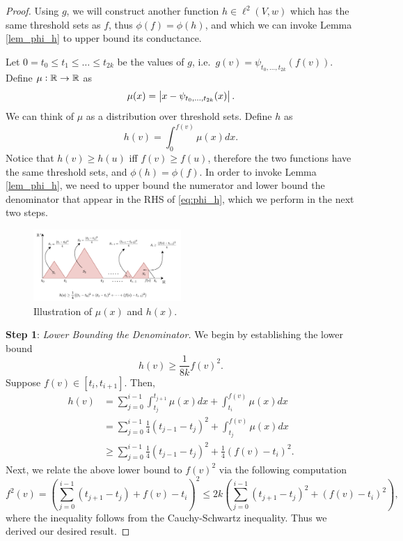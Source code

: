 \documentclass[11pt]{article}
\begin{document}
\begin{proof}
    Using $g$, we will construct another function $h \in \ell^2(V,w)$ which has the same threshold sets as $f$, thus $\phi(f) = \phi(h)$, and which we can invoke Lemma \ref{lem_phi_h} to upper bound its conductance.

    Let $0 = t_0 \leq t_1 \leq \hdots \leq t_{2k}$ be the values of $g$, i.e.\ $g(v) = \psi_{t_0,\hdots,t_{2k}}(f(v))$. Define $\mu : \mathbb R \to \mathbb R$ as
    $$\mu(x) = \left| x - \psi_{t_0,\hdots,t_{2k}}(x) \right|.$$
    We can think of $\mu$ as a distribution over threshold sets. Define $h$ as
    $$h(v) = \int_{0}^{f(v)}\mu(x)dx.$$
    Notice that $h(v) \geq h(u)$ iff $f(v) \geq f(u)$, therefore the two functions have the same threshold sets, and $\phi(h) = \phi(f)$. In order to invoke Lemma \ref{lem_phi_h}, we need to upper bound the numerator and lower bound the denominator that appear in the RHS of \eqref{eq:phi_h}, which we perform in the next two steps.

\begin{figure}
    \centering
    \includegraphics[width=0.5\textwidth]{images/h_lower_bound.png}
    \caption{Illustration of $\mu(x)$ and $h(x)$.}
\end{figure}
    \textbf{Step 1}: \textit{Lower Bounding the Denominator.} We begin by establishing the lower bound
    \begin{equation}
        h(v) \geq \frac{1}{8k}f(v)^2.
    \end{equation}
    Suppose $f(v) \in [t_i,t_{i+1}]$. Then,
    \begin{align*}
        h(v) &= \sum_{j=0}^{i-1}\int_{t_j}^{t_{j+1}}\mu(x)dx + \int_{t_i}^{f(v)}\mu(x)dx\\
        &= \sum_{j=0}^{i-1}\frac{1}{4}(t_{j-1} - t_j)^2 + \int_{t_j}^{f(v)}\mu(x)dx\\
        &\geq \sum_{j=0}^{i-1}\frac{1}{4}(t_{j-1}-t_j)^2 + \frac{1}{4}(f(v) - t_i)^2.
    \end{align*}
    Next, we relate the above lower bound to $f(v)^2$ via the following computation
    $$f^2(v) = \left(\sum_{j=0}^{i-1}(t_{j+1}-t_j) + f(v) - t_i\right)^2 \leq 2k\left(\sum_{j=0}^{i-1}(t_{j+1}-t_j)^2 + (f(v)-t_i)^2\right),$$
    where the inequality follows from the Cauchy-Schwartz inequality. Thus we derived our desired result.


\end{proof}
\end{document}
